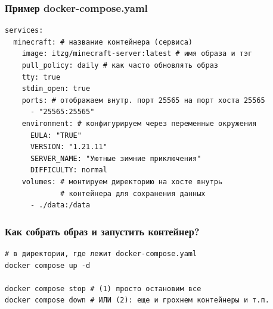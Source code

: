 \documentclass{beamer}
\begin{document}
\begin{frame}[fragile]
\frametitle{Пример docker-compose.yaml}

\begin{verbatim}
services:
  minecraft: # название контейнера (сервиса)
    image: itzg/minecraft-server:latest # имя образа и тэг
    pull_policy: daily # как часто обновлять образ
    tty: true
    stdin_open: true
    ports: # отображаем внутр. порт 25565 на порт хоста 25565
      - "25565:25565"
    environment: # конфигурируем через переменные окружения
      EULA: "TRUE"
      VERSION: "1.21.11"
      SERVER_NAME: "Уютные зимние приключения"
      DIFFICULTY: normal
    volumes: # монтируем директорию на хосте внутрь
             # контейнера для сохранения данных
      - ./data:/data
\end{verbatim}

\end{frame}

\begin{frame}[fragile]
\frametitle{Как собрать образ и запустить контейнер?}

\begin{verbatim}
# в директории, где лежит docker-compose.yaml
docker compose up -d

docker compose stop # (1) просто остановим все
docker compose down # ИЛИ (2): еще и грохнем контейнеры и т.п.
\end{verbatim}

\end{frame}
\end{document}

